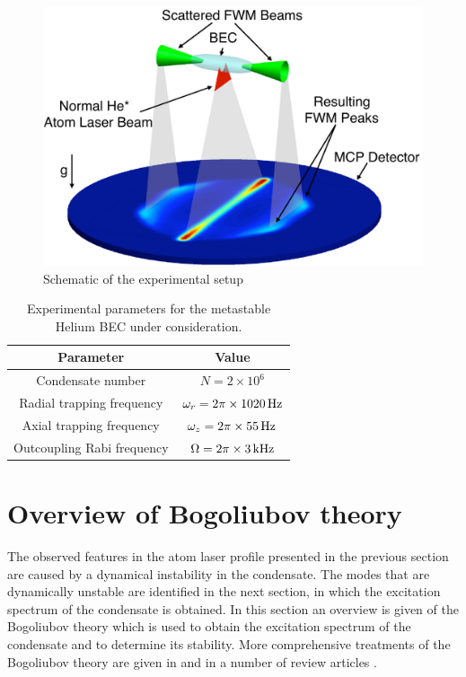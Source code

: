 \begin{figure}
    \centering
        \includegraphics[height=3in]{Schematic}
    \caption{Schematic of the experimental setup}
    \label{Peaks:Schematic}
\end{figure}


\begin{table}
    \centering
    \begin{tabular}{cc}
    \toprule
    Parameter & Value\\
    \midrule
    Condensate number & $N = 2\times 10^6$\\
    Radial trapping frequency & $\omega_r = 2 \pi \times \unit[1020]{Hz}$\\
    Axial trapping frequency & $\omega_z = 2\pi \times \unit[55]{Hz}$\\
    Outcoupling Rabi frequency & $\Omega = 2\pi \times \unit[3]{kHz}$\\
    \bottomrule
    \end{tabular}
    \caption{Experimental parameters for the metastable Helium BEC under consideration.}
    \label{Peaks:ExperimentalParameters}
\end{table}

\section{Overview of Bogoliubov theory}
\label{Peaks:ElementaryExcitations}

The observed features in the atom laser profile presented in the previous section are caused by a dynamical instability in the condensate. The modes that are dynamically unstable are identified in the next section, in which the excitation spectrum of the condensate is obtained. In this section an overview is given of the Bogoliubov theory which is used to obtain the excitation spectrum of the condensate and to determine its stability. More comprehensive treatments of the Bogoliubov theory are given in \citep{PethickSmith} and in a number of review articles \citep{Leggett:2001,Ozeri:2005,Proukakis:2008}.

